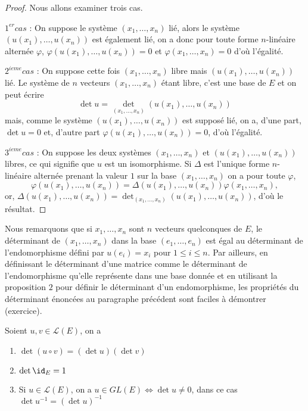 \documentclass[class=report,crop=false]{standalone}
\begin{document}
\begin{proof}
Nous allons examiner trois cas.

$1^{er} cas$ : On suppose le système $(x_1,\dots, x_n)$ lié, alors 
le système $(u(x_1),\dots,u(x_n))$
est également lié, on a donc pour toute forme $n$-linéaire alternée 
$\varphi$, $\varphi(u(x_1),\dots,u(x_n))=0$ et $\varphi(x_1,\dots,x_n)=0$ d'où l'égalité.

$2^{ieme} cas$ : On suppose cette fois $(x_1,\dots,x_n)$ libre mais 
$(u(x_1),\dots,u(x_n))$ lié. Le système de $n$ vecteurs $(x_1,\dots,x_n)$ 
étant libre, c'est une base de $E$ et on peut écrire
$$\det u=\det_{(x_1,\dots,x_n)}(u(x_1),\dots,u(x_n))$$
mais, comme le système $(u(x_1),\dots,u(x_n))$ est supposé lié, on a, 
d'une part, $\det u=0$ et, d'autre part $\varphi(u(x_1),\dots,u(x_n))=0$, d'où l'égalité.

$3^{ieme} cas$ : On suppose les deux systèmes $(x_1,\dots,x_n)$ et $(u(x_1),\dots,u(x_n))$ 
libres, ce qui signifie que $u$ est un isomorphisme. Si $\Delta$ est l'unique 
forme $n$-linéaire alternée prenant la valeur $1$ sur la base $(x_1,\dots,x_n)$ 
on a pour toute $\varphi$,
$$\varphi(u(x_1),\dots,u(x_n))=\Delta(u(x_1),\dots,u(x_n))\varphi(x_1,\dots,x_n),$$
or, $\Delta(u(x_1),\dots,u(x_n))=\det_{(x_1,\dots,x_n)}(u(x_1),\dots,u(x_n))$, 
d'où le résultat.
\end{proof}


Nous remarquons que
si $x_1,\dots,x_n$ sont $n$ vecteurs quelconques de $E$, le déterminant 
de $(x_1,\dots,x_n)$ dans la base $(e_1,\dots,e_n)$ est égal au déterminant 
de l'endomorphisme défini par 
$u(e_i)=x_i$ pour $1\leq i\leq n$. Par ailleurs, en définissant le déterminant 
d'une matrice comme le déterminant de l'endomorphisme qu'elle représente dans 
une base donnée et en utilisant la proposition $2$ pour définir le déterminant 
d'un endomorphisme, les propriétés  du déterminant énoncées au 
paragraphe précédent sont faciles à démontrer (exercice).

\begin{proposition}
Soient $u,v\in\mathcal{L}(E)$, on a
\begin{enumerate}
  \item $\det (u\circ v)=(\det u)(\det v)$
  \item $\det\id_E=1$
  \item Si $u\in\mathcal{L}(E)$, on a $u\in GL(E)\iff\det u\neq 0$, 
  dans ce cas $\det u^{-1}=(\det u)^{-1}$ 
\end{enumerate} 
\end{proposition}
\end{document}
